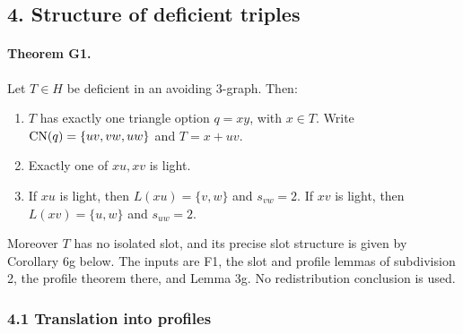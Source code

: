 \subsection*{4. Structure of deficient triples}
\paragraph{Theorem G1.} Let $T\in H$ be deficient in an avoiding $3$-graph. Then:
\begin{enumerate}
\item[(i)] $T$ has exactly one triangle option $q=xy$, with $x\in T$. Write $\operatorname{CN}(q)=\{uv,vw,uw\}$ and $T=x+uv$.
\item[(ii)] Exactly one of $xu,xv$ is light.
\item[(iii)] If $xu$ is light, then $L(xu)=\{v,w\}$ and $s_{vw}=2$. If $xv$ is light, then $L(xv)=\{u,w\}$ and $s_{uw}=2$.
\end{enumerate}
Moreover $T$ has no isolated slot, and its precise slot structure is given by Corollary 6g below. The inputs are F1, the slot and profile lemmas of subdivision 2, the profile theorem there, and Lemma 3g. No redistribution conclusion is used.

\subsubsection*{4.1 Translation into profiles}
